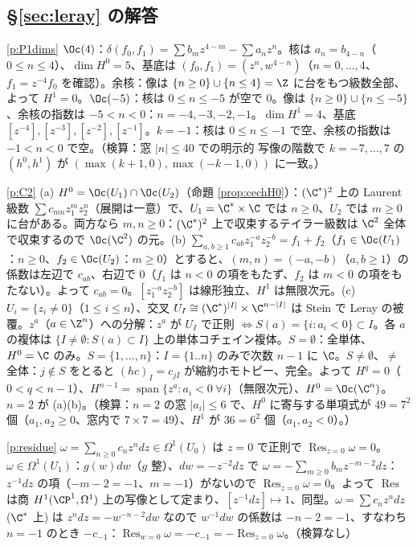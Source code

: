 \subsection*{§\ref{sec:leray} の解答}
\begin{sol}{\ref{p:P1dims}}
$\Oc(4)$：$\delta(f_0,f_1)=\sum b_mz^{4-m}-\sum a_nz^n$。核は $a_n=b_{4-n}$（$0\le n\le4$）、$\dim H^0=5$、基底は $(f_0,f_1)=(z^n,w^{4-n})$（$n=0,\dots,4$、$f_1=z^{-4}f_0$ を確認）。余核：像は $\{n\ge0\}\cup\{n\le4\}=\Z$ に台をもつ級数全部、よって $H^1=0$。$\Oc(-5)$：核は $0\le n\le-5$ が空で $0$。像は $\{n\ge0\}\cup\{n\le-5\}$、余核の指数は $-5<n<0$：$n=-4,-3,-2,-1$。$\dim H^1=4$、基底 $[z^{-4}],[z^{-3}],[z^{-2}],[z^{-1}]$。$k=-1$：核は $0\le n\le-1$ で空、余核の指数は $-1<n<0$ で空。（検算：窓 $|n|\le40$ での明示的 \Cech{} 写像の階数で $k=-7,\dots,7$ の $(h^0,h^1)$ が $(\max(k+1,0),\max(-k-1,0))$ に一致。）
\end{sol}
\begin{sol}{\ref{p:C2}}
(a) $H^0=\Oc(U_1)\cap\Oc(U_2)$（命題 \ref{prop:cechH0}）：$(\C^*)^2$ 上の Laurent 級数 $\sum c_{mn}z_1^mz_2^n$（展開は一意）で、$U_1=\C^*\times\C$ では $n\ge0$、$U_2$ では $m\ge0$ に台がある。両方なら $m,n\ge0$：$(\C^*)^2$ 上で収束するテイラー級数は $\C^2$ 全体で収束するので $\Oc(\C^2)$ の元。(b) $\sum_{a,b\ge1}c_{ab}z_1^{-a}z_2^{-b}=f_1+f_2$（$f_1\in\Oc(U_1)$：$n\ge0$、$f_2\in\Oc(U_2)$：$m\ge0$）とすると、$(m,n)=(-a,-b)$（$a,b\ge1$）の係数は左辺で $c_{ab}$、右辺で $0$（$f_1$ は $n<0$ の項をもたず、$f_2$ は $m<0$ の項をもたない）。よって $c_{ab}=0$。$[z_1^{-a}z_2^{-b}]$ は線形独立、$H^1$ は無限次元。(c) $U_i=\{z_i\ne0\}$（$1\le i\le n$）、交叉 $U_I\cong(\C^*)^{|I|}\times\C^{n-|I|}$ は Stein で Leray の被覆。$z^a$（$a\in\Z^n$）への分解：$z^a$ が $U_I$ で正則 $\iff S(a)=\{i:a_i<0\}\subset I$。各 $a$ の複体は $\{I\ne\emptyset:S(a)\subset I\}$ 上の単体コチェイン複体。$S=\emptyset$：全単体、$H^0=\C$ のみ。$S=\{1,\dots,n\}$：$I=\{1..n\}$ のみで次数 $n-1$ に $\C$。$S\ne\emptyset$、$\ne$ 全体：$j\notin S$ をとると $(hc)_I=c_{jI}$ が縮約ホモトピー、完全。よって $H^q=0$（$0<q<n-1$）、$H^{n-1}=\operatorname{span}\{z^a:a_i<0\ \forall i\}$（無限次元）、$H^0=\Oc(\C^n)$。$n=2$ が (a)(b)。（検算：$n=2$ の窓 $|a_i|\le6$ で、$H^0$ に寄与する単項式が $49=7^2$ 個（$a_1,a_2\ge0$、窓内で $7\times7=49$）、$H^1$ が $36=6^2$ 個（$a_1,a_2<0$）。）
\end{sol}
\begin{sol}{\ref{p:residue}}
$\omega=\sum_{n\ge0}c_nz^ndz\in\Omega^1(U_0)$ は $z=0$ で正則で $\operatorname{Res}_{z=0}\omega=0$。$\omega\in\Omega^1(U_1)$：$g(w)dw$（$g$ 整）、$dw=-z^{-2}dz$ で $\omega=-\sum_{m\ge0}b_mz^{-m-2}dz$：$z^{-1}dz$ の項（$-m-2=-1$、$m=-1$）がないので $\operatorname{Res}_{z=0}\omega=0$。よって $\operatorname{Res}$ は商 $H^1(\CP^1,\Omega^1)$ 上の写像として定まり、$[z^{-1}dz]\mapsto1$、同型。$\omega=\sum c_nz^ndz$ ($\C^*$ 上) は $z^ndz=-w^{-n-2}dw$ なので $w^{-1}dw$ の係数は $-n-2=-1$、すなわち $n=-1$ のとき $-c_{-1}$：$\operatorname{Res}_{w=0}\omega=-c_{-1}=-\operatorname{Res}_{z=0}\omega$。（検算なし）
\end{sol}
